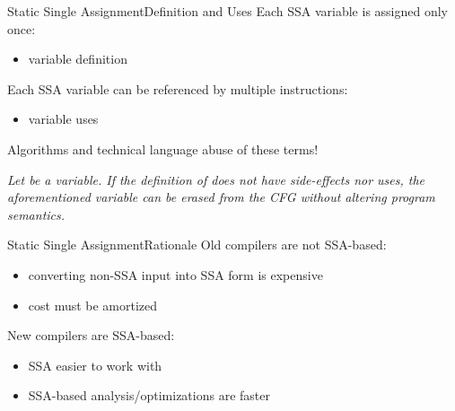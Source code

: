 \begin{frame}{Static Single Assignment}{Definition and Uses}
Each SSA variable is assigned only once:

\begin{itemize}
\item variable \alert{definition}
\end{itemize}

\vfill
Each SSA variable can be referenced by multiple instructions:

\begin{itemize}
\item variable \alert{uses}
\end{itemize}

\vfill
Algorithms and technical language abuse of these terms!

\vfill
\emph{
Let  be a variable. If the definition of  does not
have side-effects nor uses, the aforementioned  variable 
can be erased from the CFG without altering program semantics.
}
\end{frame}


\begin{frame}{Static Single Assignment}{Rationale}
Old compilers are not SSA-based:

\begin{itemize}
\item converting non-SSA input into SSA form is expensive
\item cost must be amortized
\end{itemize}

\vfill
New compilers are SSA-based:

\begin{itemize}
\item SSA easier to work with
\item SSA-based analysis/optimizations are faster
\end{itemize}

\vfill
%
\end{frame}
